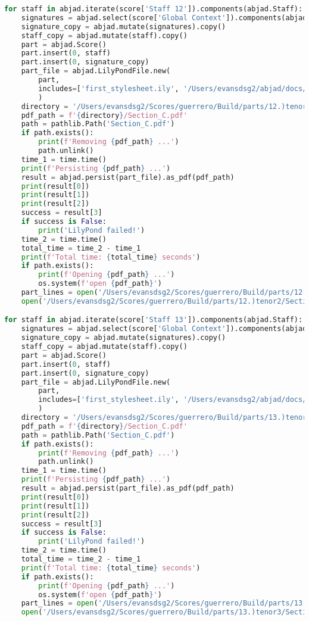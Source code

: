 \begin{lstlisting}[language=Python, caption=Invocation Source Code]
for staff in abjad.iterate(score['Staff 12']).components(abjad.Staff):
    signatures = abjad.select(score['Global Context']).components(abjad.Staff)
    signature_copy = abjad.mutate(signatures).copy()
    staff_copy = abjad.mutate(staff).copy()
    part = abjad.Score()
    part.insert(0, staff)
    part.insert(0, signature_copy)
    part_file = abjad.LilyPondFile.new(
        part,
        includes=['first_stylesheet.ily', '/Users/evansdsg2/abjad/docs/source/_stylesheets/abjad.ily'],
        )
    directory = '/Users/evansdsg2/Scores/guerrero/Build/parts/12.)tenor2'
    pdf_path = f'{directory}/Section_C.pdf'
    path = pathlib.Path('Section_C.pdf')
    if path.exists():
        print(f'Removing {pdf_path} ...')
        path.unlink()
    time_1 = time.time()
    print(f'Persisting {pdf_path} ...')
    result = abjad.persist(part_file).as_pdf(pdf_path)
    print(result[0])
    print(result[1])
    print(result[2])
    success = result[3]
    if success is False:
        print('LilyPond failed!')
    time_2 = time.time()
    total_time = time_2 - time_1
    print(f'Total time: {total_time} seconds')
    if path.exists():
        print(f'Opening {pdf_path} ...')
        os.system(f'open {pdf_path}')
    part_lines = open('/Users/evansdsg2/Scores/guerrero/Build/parts/12.)tenor2/Section_C.ly').readlines()
    open('/Users/evansdsg2/Scores/guerrero/Build/parts/12.)tenor2/Section_C.ly', 'w').writelines(part_lines[15:-1])

for staff in abjad.iterate(score['Staff 13']).components(abjad.Staff):
    signatures = abjad.select(score['Global Context']).components(abjad.Staff)
    signature_copy = abjad.mutate(signatures).copy()
    staff_copy = abjad.mutate(staff).copy()
    part = abjad.Score()
    part.insert(0, staff)
    part.insert(0, signature_copy)
    part_file = abjad.LilyPondFile.new(
        part,
        includes=['first_stylesheet.ily', '/Users/evansdsg2/abjad/docs/source/_stylesheets/abjad.ily'],
        )
    directory = '/Users/evansdsg2/Scores/guerrero/Build/parts/13.)tenor3'
    pdf_path = f'{directory}/Section_C.pdf'
    path = pathlib.Path('Section_C.pdf')
    if path.exists():
        print(f'Removing {pdf_path} ...')
        path.unlink()
    time_1 = time.time()
    print(f'Persisting {pdf_path} ...')
    result = abjad.persist(part_file).as_pdf(pdf_path)
    print(result[0])
    print(result[1])
    print(result[2])
    success = result[3]
    if success is False:
        print('LilyPond failed!')
    time_2 = time.time()
    total_time = time_2 - time_1
    print(f'Total time: {total_time} seconds')
    if path.exists():
        print(f'Opening {pdf_path} ...')
        os.system(f'open {pdf_path}')
    part_lines = open('/Users/evansdsg2/Scores/guerrero/Build/parts/13.)tenor3/Section_C.ly').readlines()
    open('/Users/evansdsg2/Scores/guerrero/Build/parts/13.)tenor3/Section_C.ly', 'w').writelines(part_lines[15:-1])


\end{lstlisting}
